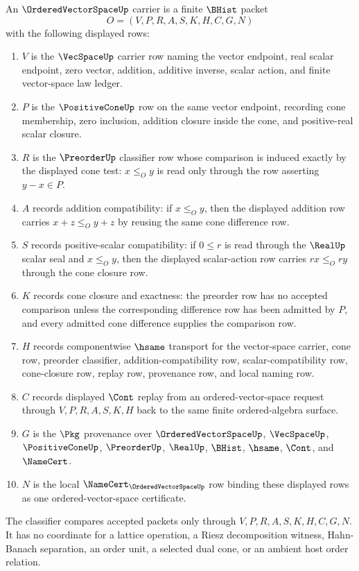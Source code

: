 \begin{definition}
\label{def:ordered-vector-space-namecert-surface}
An $\OrderedVectorSpaceUp$ carrier is a finite $\BHist$ packet
$$
O=(V,P,R,A,S,K,H,C,G,N)
$$
with the following displayed rows:
\begin{enumerate}
\item $V$ is the $\VecSpaceUp$ carrier row naming the vector endpoint, real scalar endpoint, zero vector, addition, additive inverse, scalar action, and finite vector-space law ledger.
\item $P$ is the $\PositiveConeUp$ row on the same vector endpoint, recording cone membership, zero inclusion, addition closure inside the cone, and positive-real scalar closure.
\item $R$ is the $\PreorderUp$ classifier row whose comparison is induced exactly by the displayed cone test: $x\leq_O y$ is read only through the row asserting $y-x\in P$.
\item $A$ records addition compatibility: if $x\leq_O y$, then the displayed addition row carries $x+z\leq_O y+z$ by reusing the same cone difference row.
\item $S$ records positive-scalar compatibility: if $0\leq r$ is read through the $\RealUp$ scalar seal and $x\leq_O y$, then the displayed scalar-action row carries $r x\leq_O r y$ through the cone closure row.
\item $K$ records cone closure and exactness: the preorder row has no accepted comparison unless the corresponding difference row has been admitted by $P$, and every admitted cone difference supplies the comparison row.
\item $H$ records componentwise $\hsame$ transport for the vector-space carrier, cone row, preorder classifier, addition-compatibility row, scalar-compatibility row, cone-closure row, replay row, provenance row, and local naming row.
\item $C$ records displayed $\Cont$ replay from an ordered-vector-space request through $V,P,R,A,S,K,H$ back to the same finite ordered-algebra surface.
\item $G$ is the $\Pkg$ provenance over $\OrderedVectorSpaceUp$, $\VecSpaceUp$, $\PositiveConeUp$, $\PreorderUp$, $\RealUp$, $\BHist$, $\hsame$, $\Cont$, and $\NameCert$.
\item $N$ is the local $\NameCert_{\OrderedVectorSpaceUp}$ row binding these displayed rows as one ordered-vector-space certificate.
\end{enumerate}
The classifier compares accepted packets only through $V,P,R,A,S,K,H,C,G,N$. It has no coordinate for a lattice operation, a Riesz decomposition witness, Hahn-Banach separation, an order unit, a selected dual cone, or an ambient host order relation.
\end{definition}

